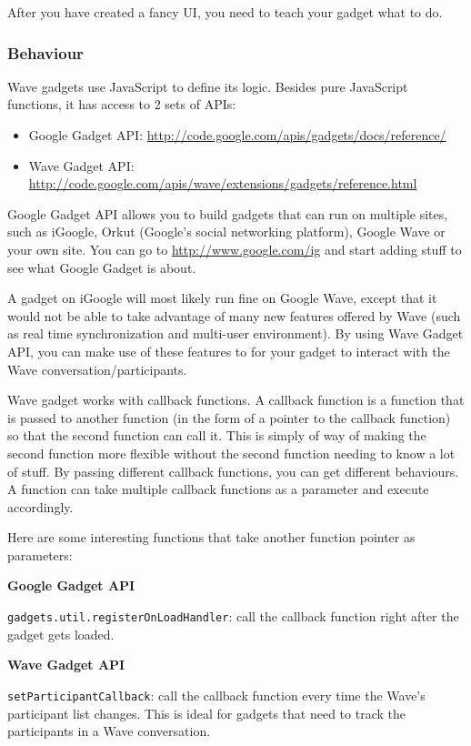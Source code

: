 After you have created a fancy UI, you need to teach your gadget what
to do.

\subsubsection{Behaviour}

Wave gadgets use JavaScript to define its logic. Besides pure
JavaScript functions, it has access to 2 sets of APIs:

\begin{itemize}
\item Google Gadget API: \url{http://code.google.com/apis/gadgets/docs/reference/}
\item Wave Gadget API: \url{http://code.google.com/apis/wave/extensions/gadgets/reference.html}
\end{itemize}

Google Gadget API allows you to build gadgets that can run on multiple
sites, such as iGoogle, Orkut (Google's social networking platform),
Google Wave or your own site. You can go
to \url{http://www.google.com/ig} and start adding stuff to see what
Google Gadget is about.

A gadget on iGoogle will most likely run fine on Google Wave, except
that it would not be able to take advantage of many new features
offered by Wave (such as real time synchronization and multi-user
environment). By using Wave Gadget API, you can make use of these
features to for your gadget to interact with the Wave
conversation/participants.

Wave gadget works with callback functions. A callback function is a
function that is passed to another function (in the form of a pointer
to the callback function) so that the second function can call
it. This is simply of way of making the second function more flexible
without the second function needing to know a lot of stuff. By passing
different callback functions, you can get different behaviours. A
function can take multiple callback functions as a parameter and
execute accordingly.

Here are some interesting functions that take another function pointer
as parameters:

\textbf{Google Gadget API}

{\tt gadgets.util.registerOnLoadHandler}: call the callback function
right after the gadget gets loaded.

\textbf{Wave Gadget API}

{\tt setParticipantCallback}: call the callback function every time
the Wave's participant list changes. This is ideal for gadgets that
need to track the participants in a Wave conversation.

